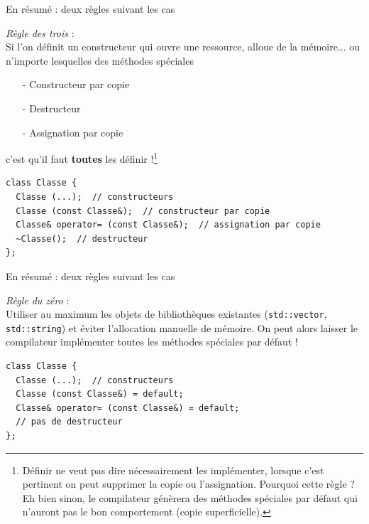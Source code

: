 \documentclass[c]{beamer}
\newcommand{\inline}[1]{\texttt{#1}}
\begin{document}

\begin{frame}[fragile]{En résumé : deux règles suivant les cas}

\emph{Règle des trois} :\\[0.5em]
Si l'on définit un constructeur qui ouvre une ressource, alloue de la mémoire... ou n'importe lesquelles des méthodes spéciales
\begin{itemize}
  \item[-] Constructeur par copie
  \item[-] Destructeur
  \item[-] Assignation par copie
\end{itemize}
\pause
c'est qu'il faut \textbf{toutes} les définir !\footnote{Définir ne veut pas dire nécessairement les implémenter, lorsque c'est pertinent on peut supprimer la copie ou l'assignation. Pourquoi cette règle ? Eh bien sinon, le compilateur génèrera des méthodes spéciales par défaut qui n'auront pas le bon comportement (copie superficielle).}
\vspace{1em}

\begin{verbatim}
class Classe {
  Classe (...);  // constructeurs
  Classe (const Classe&);  // constructeur par copie
  Classe& operator= (const Classe&);  // assignation par copie
  ~Classe();  // destructeur
};
\end{verbatim}

\end{frame}


\begin{frame}[fragile]{En résumé : deux règles suivant les cas}

\emph{Règle du zéro} :\\[0.5em]
Utiliser au maximum les objets de bibliothèques existantes (\inline{std::vector}, \inline{std::string}) et éviter l'allocation manuelle de mémoire. On peut alors laisser le compilateur implémenter toutes les méthodes spéciales par défaut !
\vspace{1em}

\begin{verbatim}
class Classe {
  Classe (...);  // constructeurs
  Classe (const Classe&) = default;
  Classe& operator= (const Classe&) = default;
  // pas de destructeur
};
\end{verbatim}

\end{frame}
\end{document}

